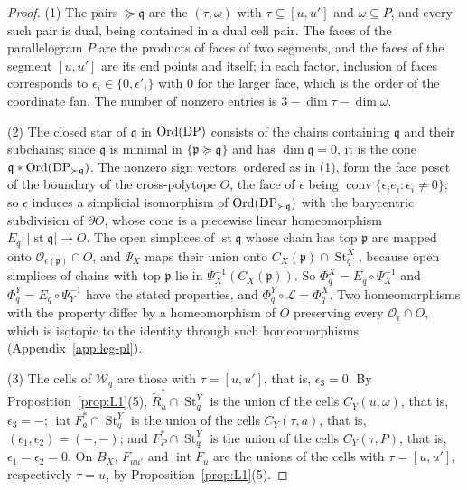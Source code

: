 \begin{proof}
(1) The pairs $\succeq{\mathfrak q}$ are the $(\tau,\omega)$ with $\tau\subseteq[u,u']$ and $\omega\subseteq P$, and every such pair is
dual, being contained in a dual cell pair. The faces of the parallelogram $P$ are the products of faces of two segments, and the
faces of the segment $[u,u']$ are its end points and itself; in each factor, inclusion of faces corresponds to
$\epsilon_i\in\{0,\epsilon'_i\}$ with $0$ for the larger face, which is the order of the coordinate fan. The number of
nonzero entries is $3-\dim\tau-\dim\omega$.

(2) The closed star of ${\mathfrak q}$ in $\operatorname{Ord}(\mathrm{DP})$ consists of the chains containing ${\mathfrak q}$ and their subchains; since ${\mathfrak q}$ is
minimal in $\{{\mathfrak p}\succeq{\mathfrak q}\}$ and has $\dim{\mathfrak q}=0$, it is the cone ${\mathfrak q}*\operatorname{Ord}(\mathrm{DP}_{\succ{\mathfrak q}})$. The nonzero sign vectors, ordered
as in (1), form the face poset of the boundary of the cross-polytope $O$, the face of $\epsilon$ being
$\operatorname{conv}\{\epsilon_ie_i:\epsilon_i\ne0\}$; so $\epsilon$ induces a simplicial isomorphism of
$\operatorname{Ord}(\mathrm{DP}_{\succ{\mathfrak q}})$ with the barycentric subdivision of $\partial O$, whose cone is a piecewise linear homeomorphism
$E_q\colon|\operatorname{st}{\mathfrak q}|\to O$. The open simplices of $\operatorname{st}{\mathfrak q}$ whose chain has top ${\mathfrak p}$ are mapped onto
$\mathcal O_{\epsilon({\mathfrak p})}\cap O$, and $\Psi_X$ maps their union onto $C_X({\mathfrak p})\cap\operatorname{St}^X_q$, because open
simplices of chains with top ${\mathfrak p}$ lie in $\Psi_X^{-1}(C_X({\mathfrak p}))$. So $\Phi^X_q=E_q\circ\Psi_X^{-1}$ and
$\Phi^Y_q=E_q\circ\Psi_Y^{-1}$ have the stated properties, and $\Phi^Y_q\circ\mathcal L=\Phi^X_q$. Two homeomorphisms with
the property differ by a homeomorphism of $O$ preserving every $\mathcal O_\epsilon\cap O$, which is isotopic to the
identity through such homeomorphisms (Appendix~\ref{app:leg-pl}).

(3) The cells of $\mathcal W_q$ are those with $\tau=[u,u']$, that is, $\epsilon_3=0$. By
Proposition~\ref{prop:L1}(5), $\widetilde R^*_u\cap\operatorname{St}^Y_q$ is the union of the cells $C_Y(u,\omega)$, that
is, $\epsilon_3=-$; $\operatorname{int}F^*_a\cap\operatorname{St}^Y_q$ is the union of the cells $C_Y(\tau,a)$, that is,
$(\epsilon_1,\epsilon_2)=(-,-)$; and $F^*_P\cap\operatorname{St}^Y_q$ is the union of the cells $C_Y(\tau,P)$, that is,
$\epsilon_1=\epsilon_2=0$. On $B_X$, $F_{uu'}$ and $\operatorname{int}F_u$ are the unions of the cells with $\tau=[u,u']$,
respectively $\tau=u$, by Proposition~\ref{prop:L1}(5).
\end{proof}

